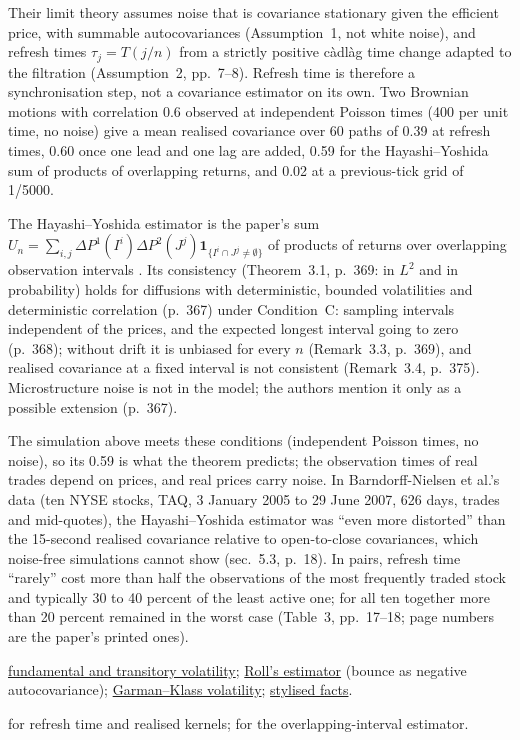 \begin{qfmethod}
Their limit theory assumes noise that is covariance stationary given the efficient price, with summable autocovariances (Assumption~1, not white noise), and refresh times $\tau_j=T(j/n)$ from a strictly positive c\`adl\`ag time change adapted to the filtration (Assumption~2, pp.~7--8). Refresh time is therefore a synchronisation step, not a covariance estimator on its own. Two Brownian motions with correlation 0.6 observed at independent Poisson times (400 per unit time, no noise) give a mean realised covariance over 60 paths of 0.39 at refresh times, 0.60 once one lead and one lag are added, 0.59 for the Hayashi--Yoshida sum of products of overlapping returns, and 0.02 at a previous-tick grid of 1/5000.

The Hayashi--Yoshida estimator is the paper's sum $U_n=\sum_{i,j}\Delta P^1(I^i)\Delta P^2(J^j)\mathbf 1_{\{I^i\cap J^j\neq\emptyset\}}$ of products of returns over overlapping observation intervals \citep[Definition~3.1, eq.~(3.1), p.~368]{hayashi-yoshida-2005}. Its consistency (Theorem~3.1, p.~369: in $L^2$ and in probability) holds for diffusions with deterministic, bounded volatilities and deterministic correlation (p.~367) under Condition~C: sampling intervals independent of the prices, and the expected longest interval going to zero (p.~368); without drift it is unbiased for every $n$ (Remark~3.3, p.~369), and realised covariance at a fixed interval is not consistent (Remark~3.4, p.~375). Microstructure noise is not in the model; the authors mention it only as a possible extension (p.~367).

The simulation above meets these conditions (independent Poisson times, no noise), so its 0.59 is what the theorem predicts; the observation times of real trades depend on prices, and real prices carry noise. In Barndorff-Nielsen et al.'s data (ten NYSE stocks, TAQ, 3 January 2005 to 29 June 2007, 626 days, trades and mid-quotes), the Hayashi--Yoshida estimator was ``even more distorted'' than the 15-second realised covariance relative to open-to-close covariances, which noise-free simulations cannot show (sec.~5.3, p.~18). In pairs, refresh time ``rarely'' cost more than half the observations of the most frequently traded stock and typically 30 to 40 percent of the least active one; for all ten together more than 20 percent remained in the worst case (Table~3, pp.~17--18; page numbers are the paper's printed ones).

 \hyperref[def:volatility-components]{fundamental and transitory volatility}; \hyperref[res:roll-spread-estimator]{Roll's estimator} (bounce as negative autocovariance); \hyperref[meth:garman-klass-volatility]{Garman--Klass volatility}; \hyperref[ev:high-frequency-stylised-facts]{stylised facts}.

 \citep{bnhls-2008} for refresh time and realised kernels; \citep{hayashi-yoshida-2005} for the overlapping-interval estimator.

\end{qfmethod}

